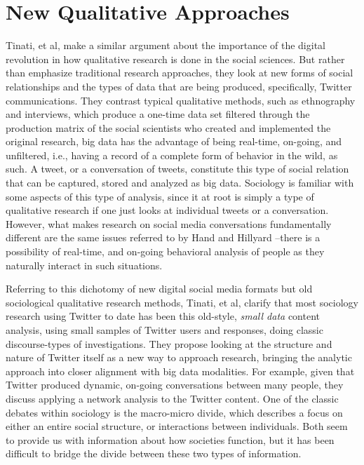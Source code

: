 \documentclass[sigconf]{acmart}
\begin{document}
\section{New Qualitative Approaches}
Tinati, et al, make a similar argument about the importance of the digital revolution in how qualitative research is done in the social sciences. \cite{tinati14}  But rather than emphasize traditional research approaches, they look at new forms of social relationships and the types of data that are being produced, specifically, Twitter communications.  They contrast typical qualitative methods, such as ethnography and interviews, which produce a one-time data set filtered through the production matrix of the social scientists who created and implemented the original research, big data has the advantage of being real-time, on-going, and unfiltered, i.e., having a record of a complete form of behavior in the wild, as such.  A tweet, or a conversation of tweets, constitute this type of social relation that can be captured, stored and analyzed as big data. \cite{felt16}  Sociology is familiar with some aspects of this type of analysis, since it at root is simply a type of qualitative research if one just looks at individual tweets or a conversation.  However, what makes research on social media conversations fundamentally different are the same issues referred to by Hand and Hillyard \cite{hand14}--there is a possibility of real-time, and on-going behavioral analysis of people as they naturally interact in such situations. 

Referring to this dichotomy of new digital social media formats but old sociological qualitative research methods, Tinati, et al, clarify that most sociology research using Twitter to date has been this old-style, {\em small data} content analysis, using small samples of Twitter users and responses, doing classic discourse-types of investigations.  They propose looking at the structure and nature of Twitter itself as a new way to approach research, bringing the analytic approach into closer alignment with big data modalities.  For example, given that Twitter produced dynamic, on-going conversations between many people, they discuss applying a network analysis to the Twitter content. \cite{felt16} One of the classic debates within sociology is the macro-micro divide, which describes a focus on either an entire social structure, or interactions between individuals.  Both seem to provide us with information about how societies function, but it has been difficult to bridge the divide between these two types of information.  
\end{document}
